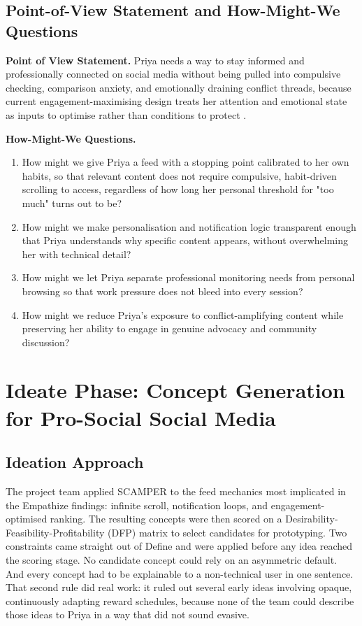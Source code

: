 \documentclass[11pt]{article}
\begin{document}
\subsection{Point-of-View Statement and How-Might-We Questions}
\label{sec:mindfulfeed_pov_define}
\textbf{Point of View Statement.} Priya needs a way to stay informed and professionally connected on social media without being pulled into compulsive checking, comparison anxiety, and emotionally draining conflict threads, because current engagement-maximising design treats her attention and emotional state as inputs to optimise rather than conditions to protect \parencites[6]{9300898}[8]{2404919}.

\textbf{How-Might-We Questions.}
\begin{enumerate}
\item How might we give Priya a feed with a stopping point calibrated to her own habits, so that relevant content does not require compulsive, habit-driven scrolling to access, regardless of how long her personal threshold for "too much" turns out to be?
\item How might we make personalisation and notification logic transparent enough that Priya understands why specific content appears, without overwhelming her with technical detail?
\item How might we let Priya separate professional monitoring needs from personal browsing so that work pressure does not bleed into every session?
\item How might we reduce Priya's exposure to conflict-amplifying content while preserving her ability to engage in genuine advocacy and community discussion?
\end{enumerate}

\section{Ideate Phase: Concept Generation for Pro-Social Social Media}

\subsection{Ideation Approach}
The project team applied SCAMPER to the feed mechanics most implicated in the Empathize findings: infinite scroll, notification loops, and engagement-optimised ranking. The resulting concepts were then scored on a Desirability-Feasibility-Profitability (DFP) matrix to select candidates for prototyping. Two constraints came straight out of Define and were applied before any idea reached the scoring stage. No candidate concept could rely on an asymmetric default. And every concept had to be explainable to a non-technical user in one sentence. That second rule did real work: it ruled out several early ideas involving opaque, continuously adapting reward schedules, because none of the team could describe those ideas to Priya in a way that did not sound evasive.
\end{document}
